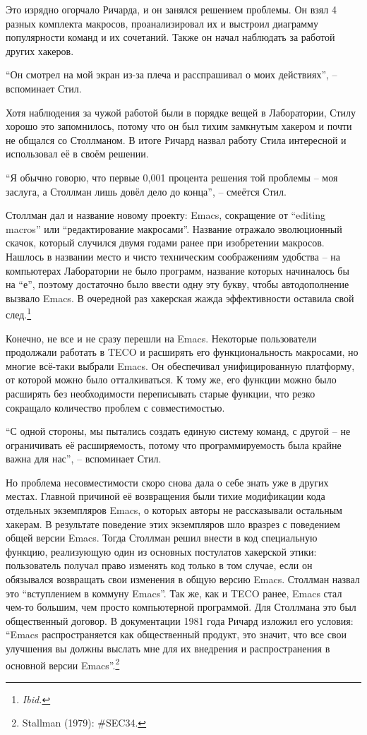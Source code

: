 Это изрядно огорчало Ричарда, и он занялся решением проблемы. Он взял 4 разных комплекта макросов, проанализировал их и выстроил диаграмму популярности команд и их сочетаний. Также он начал наблюдать за работой других хакеров.

\enquote{Он смотрел на мой экран из-за плеча и расспрашивал о моих действиях}, -- вспоминает Стил.

Хотя наблюдения за чужой работой были в порядке вещей в Лаборатории, Стилу хорошо это запомнилось, потому что он был тихим замкнутым хакером и почти не общался со Столлманом. В итоге Ричард назвал работу Стила интересной и использовал её в своём решении.

\enquote{Я обычно говорю, что первые 0,001 процента решения той проблемы -- моя заслуга, а Столлман лишь довёл дело до конца}, -- смеётся Стил.

Столлман дал и название новому проекту: Emacs, сокращение от \enquote{editing macros} или \enquote{редактирование макросами}. Название отражало эволюционный скачок, который случился двумя годами ранее при изобретении макросов. Нашлось в названии место и чисто техническим соображениям удобства -- на компьютерах Лаборатории не было программ, название которых начиналось бы на \enquote{е}, поэтому достаточно было ввести одну эту букву, чтобы автодополнение вызвало Emacs. В очередной раз хакерская жажда эффективности оставила свой след.\footnote{\textit{Ibid.}}

Конечно, не все и не сразу перешли на Emacs. Некоторые пользователи продолжали работать в TECO и расширять его функциональность макросами, но многие всё-таки выбрали Emacs. Он обеспечивал унифицированную платформу, от которой можно было отталкиваться. К тому же, его функции можно было расширять без необходимости переписывать старые функции, что резко сокращало количество проблем с совместимостью.

\enquote{С одной стороны, мы пытались создать единую систему команд, с другой -- не ограничивать её расширяемость, потому что программируемость была крайне важна для нас}, -- вспоминает Стил.

Но проблема несовместимости скоро снова дала о себе знать уже в других местах. Главной причиной её возвращения были тихие модификации кода отдельных экземпляров Emacs, о которых авторы не рассказывали остальным хакерам. В результате поведение этих экземпляров шло вразрез с поведением общей версии Emacs. Тогда Столлман решил внести в код специальную функцию, реализующую один из основных постулатов хакерской этики: пользователь получал право изменять код только в том случае, если он обязывался возвращать свои изменения в общую версию Emacs. Столлман назвал это \enquote{вступлением в коммуну Emacs}. Так же, как и TECO ранее, Emacs стал чем-то большим, чем просто компьютерной программой. Для Столлмана это был общественный договор. В документации 1981 года Ричард изложил его условия: \enquote{Emacs распространяется как общественный продукт, это значит, что все свои улучшения вы должны выслать мне для их внедрения и распространения в основной версии Emacs}.\footnote{Stallman (1979): \#SEC34.}

